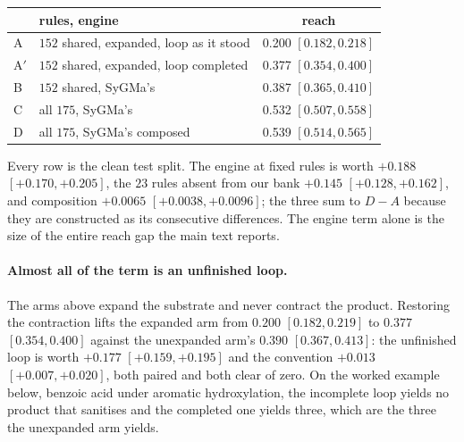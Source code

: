 \begin{center}
\begin{tabular}{llc}
\toprule
& rules, engine & reach \\
\midrule
A & $152$ shared, expanded, loop as it stood & 0.200 $[0.182,0.218]$ \\
A$'$ & $152$ shared, expanded, loop completed & 0.377 $[0.354,0.400]$ \\
B & $152$ shared, SyGMa's       & 0.387 $[0.365,0.410]$ \\
C & all $175$, SyGMa's          & 0.532 $[0.507,0.558]$ \\
D & all $175$, SyGMa's composed & 0.539 $[0.514,0.565]$ \\
\bottomrule
\end{tabular}
\end{center}

Every row is the clean test split. The engine at fixed rules is worth $+0.188$ $[+0.170,+0.205]$,
the $23$ rules absent from our bank $+0.145$ $[+0.128,+0.162]$, and composition $+0.0065$
$[+0.0038,+0.0096]$; the three sum to $D-A$ because they are constructed as its consecutive
differences. The engine term alone is the size of the entire reach gap the main text reports.

\paragraph{Almost all of the term is an unfinished loop.} The arms above expand the substrate and
never contract the product. Restoring the contraction lifts the expanded arm from $0.200$
$[0.182,0.219]$ to $0.377$ $[0.354,0.400]$ against the unexpanded arm's $0.390$ $[0.367,0.413]$: the
unfinished loop is worth $+0.177$ $[+0.159,+0.195]$ and the convention $+0.013$ $[+0.007,+0.020]$,
both paired and both clear of zero. On the worked example below, benzoic acid under aromatic
hydroxylation, the incomplete loop yields no product that sanitises and the completed one yields
three, which are the three the unexpanded arm yields.

